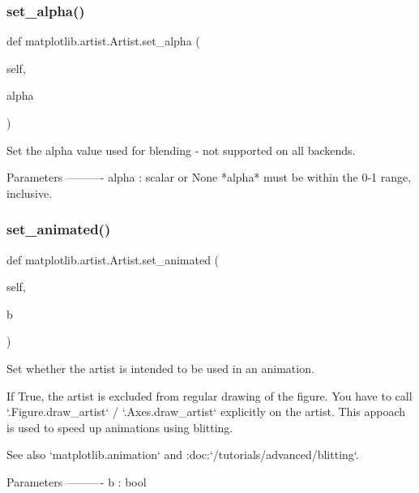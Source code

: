 \subsubsection{\texorpdfstring{set\+\_\+alpha()}{set\_alpha()}}
{\footnotesize\ttfamily def matplotlib.\+artist.\+Artist.\+set\+\_\+alpha (\begin{DoxyParamCaption}\item[{}]{self,  }\item[{}]{alpha }\end{DoxyParamCaption})}

\begin{DoxyVerb}Set the alpha value used for blending - not supported on all backends.

Parameters
----------
alpha : scalar or None
    *alpha* must be within the 0-1 range, inclusive.
\end{DoxyVerb}
 \mbox{\label{classmatplotlib_1_1artist_1_1Artist_ac906bf262f0ebe34445cca570697184e}} 
\subsubsection{\texorpdfstring{set\+\_\+animated()}{set\_animated()}}
{\footnotesize\ttfamily def matplotlib.\+artist.\+Artist.\+set\+\_\+animated (\begin{DoxyParamCaption}\item[{}]{self,  }\item[{}]{b }\end{DoxyParamCaption})}

\begin{DoxyVerb}Set whether the artist is intended to be used in an animation.

If True, the artist is excluded from regular drawing of the figure.
You have to call `.Figure.draw_artist` / `.Axes.draw_artist`
explicitly on the artist. This appoach is used to speed up animations
using blitting.

See also `matplotlib.animation` and
:doc:`/tutorials/advanced/blitting`.

Parameters
----------
b : bool
\end{DoxyVerb}
 \mbox{\label{classmatplotlib_1_1artist_1_1Artist_aaffb85c06ad99620859f82d48bd49e1d}} 
